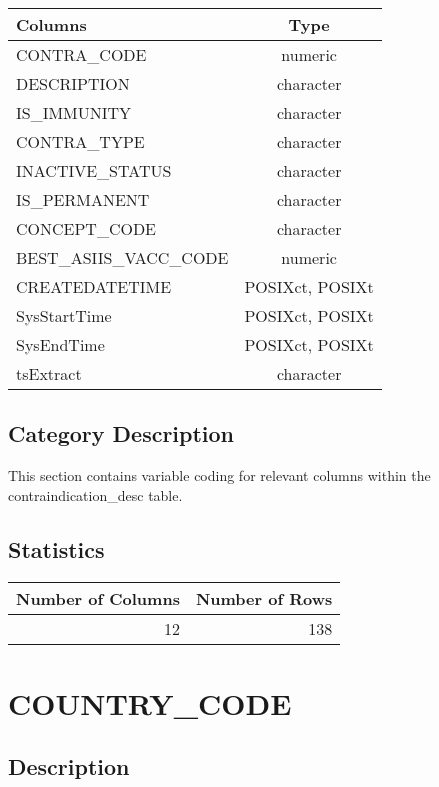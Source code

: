 \documentclass[
  letterpaper,
  DIV=11,
  numbers=noendperiod]{scrreprt}
\begin{document}
\begin{longtable}{lc}
\toprule
Columns & Type \\ 
\midrule
CONTRA\_CODE & numeric \\ 
DESCRIPTION & character \\ 
IS\_IMMUNITY & character \\ 
CONTRA\_TYPE & character \\ 
INACTIVE\_STATUS & character \\ 
IS\_PERMANENT & character \\ 
CONCEPT\_CODE & character \\ 
BEST\_ASIIS\_VACC\_CODE & numeric \\ 
CREATEDATETIME & POSIXct, POSIXt \\ 
SysStartTime & POSIXct, POSIXt \\ 
SysEndTime & POSIXct, POSIXt \\ 
tsExtract & character \\ 
\bottomrule
\end{longtable}

\hypertarget{category-description-4}{%
\section*{Category Description}\label{category-description-4}}

This section contains variable coding for relevant columns within the
contraindication\_desc table.

\hypertarget{statistics-4}{%
\section*{Statistics}\label{statistics-4}}

\begin{longtable}{rr}
\toprule
Number of Columns & Number of Rows \\ 
\midrule
12 & 138 \\ 
\bottomrule
\end{longtable}

\hypertarget{country_code}{%
\chapter*{COUNTRY\_CODE}\label{country_code}}

\hypertarget{description-5}{%
\section*{Description}\label{description-5}}
\end{document}
